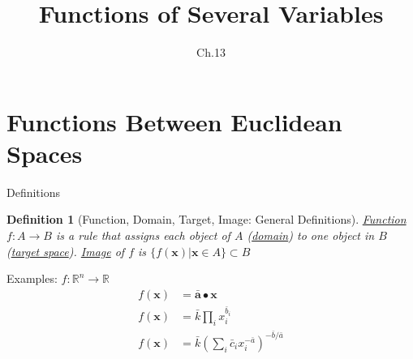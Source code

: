 \documentclass[a4paper,11pt]{article}
\author[조남운]{\mail}
\title{Functions of Several Variables}
\subtitle{Ch.13}
\newtheorem{defn}{Definition}
\begin{document}
	
\maketitle


\section{Functions Between Euclidean Spaces} %
\label{sec:functions_between_euclidean_spaces}
\begin{frame}[t]{Definitions}
	\begin{defn}
		[Function, Domain, Target, Image: General Definitions]
		\uline{Function} $f:A\rightarrow B$ is a rule that assigns each object of $A$ (\uline{domain}) to one object in $B$ (\uline{target space}). \uline{Image} of $f$ is $\{f(\mathbf{x})\vert \mathbf{x}\in A\}\subset B$
	\end{defn}
	\begin{block}
		{Examples: $f:\mathbb{R}^n\rightarrow\mathbb{R}$}
		\begin{align*}
			f(\mathbf{x})&=\bar{\mathbf{a}}\bullet\mathbf{x}\tag{Linear}\\
			f(\mathbf{x})&=\bar k \prod_i x_i^{\bar b_i} \tag{Cobb-Douglas}\\
			f(\mathbf{x})&=\bar k \left(\sum_i \bar c_i x_i ^{-\bar a}\right)^{-\bar b / \bar a} \tag{CES}
		\end{align*}
	\end{block}
\end{frame}
\end{document}
